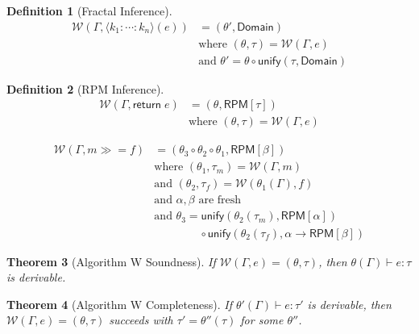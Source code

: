 \documentclass[11pt,twoside,openright]{book}
\theoremstyle{definition}
\newtheorem{definition}{Definition}[chapter]
\theoremstyle{plain}
\newtheorem{theorem}[definition]{Theorem}
\theoremstyle{remark}
\newcommand{\rpmret}{\mathsf{return}}
\newcommand{\rpmbind}{\mathbin{\gg\!=}}
\newcommand{\Subst}{\theta}                  %
\newcommand{\Unify}{\mathsf{unify}}          %
\newcommand{\AlgW}{\mathcal{W}}              %
\begin{document}
\begin{definition}[Fractal Inference]
\label{def:fractal-inference}
\begin{align}
\AlgW(\Gamma, \langle k_1 : \cdots : k_n \rangle(e)) &= (\Subst', \mathsf{Domain}) \\
  &\text{where } (\Subst, \tau) = \AlgW(\Gamma, e) \\
  &\text{and } \Subst' = \Subst \circ \Unify(\tau, \mathsf{Domain})
\end{align}
\end{definition}

\begin{definition}[RPM Inference]
\label{def:rpm-inference}
\begin{align}
\AlgW(\Gamma, \rpmret\; e) &= (\Subst, \mathsf{RPM}[\tau]) \\
  &\text{where } (\Subst, \tau) = \AlgW(\Gamma, e)
\end{align}

\begin{align}
\AlgW(\Gamma, m \rpmbind f) &= (\Subst_3 \circ \Subst_2 \circ \Subst_1, \mathsf{RPM}[\beta]) \\
  &\text{where } (\Subst_1, \tau_m) = \AlgW(\Gamma, m) \\
  &\text{and } (\Subst_2, \tau_f) = \AlgW(\Subst_1(\Gamma), f) \\
  &\text{and } \alpha, \beta \text{ are fresh} \\
  &\text{and } \Subst_3 = \Unify(\Subst_2(\tau_m), \mathsf{RPM}[\alpha]) \\
  &\qquad\qquad \circ \Unify(\Subst_2(\tau_f), \alpha \to \mathsf{RPM}[\beta])
\end{align}
\end{definition}

\begin{theorem}[Algorithm W Soundness]
\label{thm:alg-w-sound}
If $\AlgW(\Gamma, e) = (\Subst, \tau)$, then $\Subst(\Gamma) \vdash e : \tau$ is derivable.
\end{theorem}

\begin{theorem}[Algorithm W Completeness]
\label{thm:alg-w-complete}
If $\Subst'(\Gamma) \vdash e : \tau'$ is derivable, then $\AlgW(\Gamma, e) = (\Subst, \tau)$ succeeds with $\tau' = \Subst''(\tau)$ for some $\Subst''$.
\end{theorem}

\end{document}
